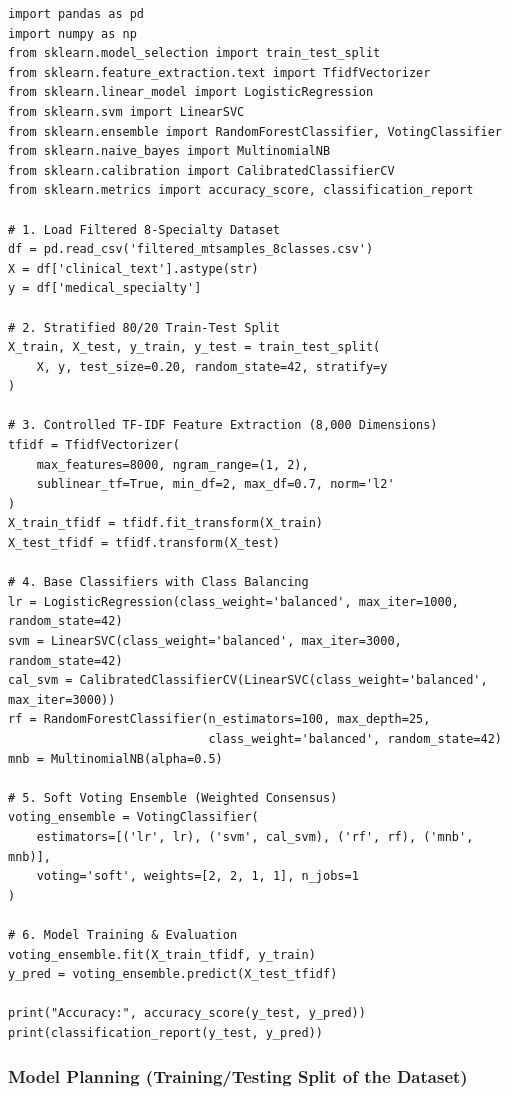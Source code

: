 \vspace{4pt}
\begin{footnotesize}
\begin{verbatim}
import pandas as pd
import numpy as np
from sklearn.model_selection import train_test_split
from sklearn.feature_extraction.text import TfidfVectorizer
from sklearn.linear_model import LogisticRegression
from sklearn.svm import LinearSVC
from sklearn.ensemble import RandomForestClassifier, VotingClassifier
from sklearn.naive_bayes import MultinomialNB
from sklearn.calibration import CalibratedClassifierCV
from sklearn.metrics import accuracy_score, classification_report

# 1. Load Filtered 8-Specialty Dataset
df = pd.read_csv('filtered_mtsamples_8classes.csv')
X = df['clinical_text'].astype(str)
y = df['medical_specialty']

# 2. Stratified 80/20 Train-Test Split
X_train, X_test, y_train, y_test = train_test_split(
    X, y, test_size=0.20, random_state=42, stratify=y
)

# 3. Controlled TF-IDF Feature Extraction (8,000 Dimensions)
tfidf = TfidfVectorizer(
    max_features=8000, ngram_range=(1, 2),
    sublinear_tf=True, min_df=2, max_df=0.7, norm='l2'
)
X_train_tfidf = tfidf.fit_transform(X_train)
X_test_tfidf = tfidf.transform(X_test)

# 4. Base Classifiers with Class Balancing
lr = LogisticRegression(class_weight='balanced', max_iter=1000, random_state=42)
svm = LinearSVC(class_weight='balanced', max_iter=3000, random_state=42)
cal_svm = CalibratedClassifierCV(LinearSVC(class_weight='balanced', max_iter=3000))
rf = RandomForestClassifier(n_estimators=100, max_depth=25,
                            class_weight='balanced', random_state=42)
mnb = MultinomialNB(alpha=0.5)

# 5. Soft Voting Ensemble (Weighted Consensus)
voting_ensemble = VotingClassifier(
    estimators=[('lr', lr), ('svm', cal_svm), ('rf', rf), ('mnb', mnb)],
    voting='soft', weights=[2, 2, 1, 1], n_jobs=1
)

# 6. Model Training & Evaluation
voting_ensemble.fit(X_train_tfidf, y_train)
y_pred = voting_ensemble.predict(X_test_tfidf)

print("Accuracy:", accuracy_score(y_test, y_pred))
print(classification_report(y_test, y_pred))
\end{verbatim}
\end{footnotesize}
\vspace{4pt}

\subsubsection{Model Planning (Training/Testing Split of the Dataset)}

